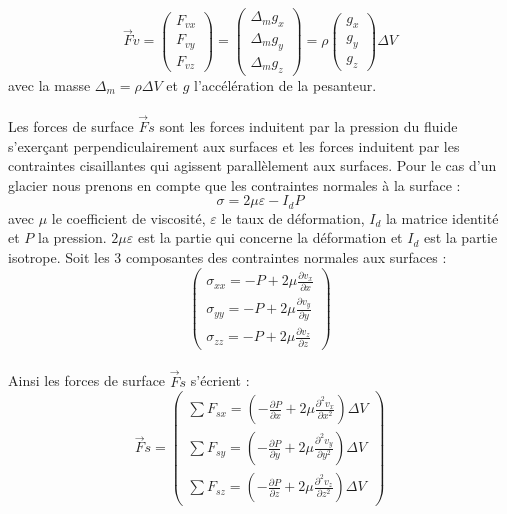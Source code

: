 \documentclass{article}
\begin{document}
\begin{equation}
\vec{F}v = 
\left(
\begin{array}{l}
F_{vx} \\
F_{vy} \\
F_{vz}
\end{array}
\right)
=
\left(
\begin{array}{l}
\Delta_{m} g_{x} \\
\Delta_{m} g_{y}  \\
\Delta_{m} g_{z} 
\end{array}
\right)
= \rho
\left(
\begin{array}{l}
g_{x} \\
g_{y}  \\
g_{z}
\end{array}
\right)
\Delta V
\end{equation}
 avec la masse $\Delta_{m} = \rho \Delta V$ et $g$ l'accélération de la pesanteur.
\\\\
Les forces de surface $\vec{F}s$ sont les forces induitent par la pression du fluide s'exerçant perpendiculairement aux surfaces et les forces induitent par les contraintes cisaillantes qui agissent parallèlement aux surfaces. Pour le cas d'un glacier nous prenons en compte que les contraintes normales à la surface : 
\begin{equation}
\sigma = 2 \mu \varepsilon - I_{d}P
\end{equation}
avec $\mu$ le coefficient de viscosité, $\varepsilon$ le taux de déformation, $I_{d}$ la matrice identité et $P$ la pression. $2\mu \varepsilon$ est la partie qui concerne la déformation et $I_{d}$ est la partie isotrope.\newline
Soit les 3 composantes des contraintes normales aux surfaces :
\begin{equation}
\left(
\begin{array}{l}
\sigma_{xx} = -P + 2 \mu \frac{\partial v_{x}}{\partial x} \\
\sigma_{yy} = -P + 2 \mu \frac{\partial v_{y}}{\partial y} \\
\sigma_{zz} = -P + 2 \mu \frac{\partial v_{z}}{\partial z}
\end{array}
\right)
\end{equation}
\\
Ainsi les forces de surface $\vec{F}s$ s'écrient : 
\begin{equation}
\vec{F}s = 
\left(
\begin{array}{l}
\sum F_{sx} = (-\frac{\partial P}{\partial x} + 2\mu \frac{\partial^2v_{x}}{\partial x^2})\Delta V  \\
\sum F_{sy} = (-\frac{\partial P}{\partial y} + 2\mu \frac{\partial^2v_{y}}{\partial y^2})\Delta V \\
\sum F_{sz} = (-\frac{\partial P}{\partial z} + 2\mu \frac{\partial^2v_{z}}{\partial z^2})\Delta V
\end{array}
\right)
\end{equation}
\end{document}
